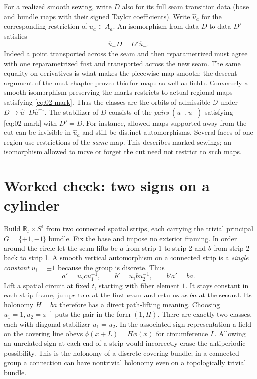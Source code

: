 For a realized smooth sewing, write $D$ also for its full seam transition data (base and bundle maps with their signed Taylor coefficients). Write $\widehat u_a$ for the corresponding restriction of $u_a\in A_a$. An isomorphism from data $D$ to data $D'$ satisfies
\begin{equation}
 \widehat u_+ D=D'\widehat u_- .\label{eq:02-mark}
\end{equation}
Indeed a point transported across the seam and then reparametrized must agree with one reparametrized first and transported across the new seam. The same equality on derivatives is what makes the piecewise map smooth; the descent argument of the next chapter proves this for maps as well as fields. Conversely a smooth isomorphism preserving the marks restricts to actual regional maps satisfying \eqref{eq:02-mark}. Thus the classes are the orbits of admissible $D$ under $D\mapsto\widehat u_+D\widehat u_-^{-1}$. The stabilizer of $D$ consists of the \emph{pairs} $(u_-,u_+)$ satisfying \eqref{eq:02-mark} with $D'=D$. For instance, allowed maps supported away from the cut can be invisible in $\widehat u_a$ and still be distinct automorphisms. Several faces of one region use restrictions of the \emph{same} map. This describes marked sewings; an isomorphism allowed to move or forget the cut need not restrict to such maps.

\section{Worked check: two signs on a cylinder}

Build $\mathbb R_t\times S^1$ from two connected spatial strips, each carrying the trivial principal $G=\{+1,-1\}$ bundle. Fix the base and impose no exterior framing. In order around the circle let the seam lifts be $a$ from strip 1 to strip 2 and $b$ from strip 2 back to strip 1. A smooth vertical automorphism on a connected strip is a \emph{single constant} $u_i=\pm1$ because the group is discrete. Thus
\[
 a'=u_2 a u_1^{-1},\qquad b'=u_1 b u_2^{-1},\qquad b'a'=ba .
\]
Lift a spatial circuit at fixed $t$, starting with fiber element $1$. It stays constant in each strip frame, jumps to $a$ at the first seam and returns as $ba$ at the second. Its holonomy $H=ba$ therefore has a direct path-lifting meaning. Choosing $u_1=1,u_2=a^{-1}$ puts the pair in the form $(1,H)$. There are exactly two classes, each with diagonal stabilizer $u_1=u_2$. In the associated sign representation a field on the covering line obeys $\phi(x+L)=H\phi(x)$ for circumference $L$. Allowing an unrelated sign at each end of a strip would incorrectly erase the antiperiodic possibility. This is the holonomy of a discrete covering bundle; in a connected group a connection can have nontrivial holonomy even on a topologically trivial bundle.

